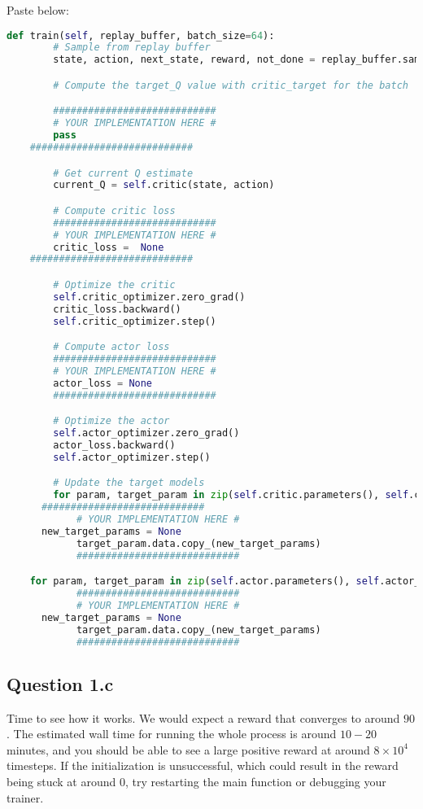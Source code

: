 \documentclass[12pt]{article}
\begin{document}
Paste below:
\begin{solution}
\begin{lstlisting}[language=Python]
def train(self, replay_buffer, batch_size=64):
		# Sample from replay buffer
		state, action, next_state, reward, not_done = replay_buffer.sample(batch_size)

		# Compute the target_Q value with critic_target for the batch

		############################
		# YOUR IMPLEMENTATION HERE #
		pass
    ############################

		# Get current Q estimate
		current_Q = self.critic(state, action)

		# Compute critic loss
		############################
		# YOUR IMPLEMENTATION HERE #
		critic_loss =  None
    ############################

		# Optimize the critic
		self.critic_optimizer.zero_grad()
		critic_loss.backward()
		self.critic_optimizer.step()

		# Compute actor loss
		############################
		# YOUR IMPLEMENTATION HERE #
		actor_loss = None
 		############################

		# Optimize the actor
		self.actor_optimizer.zero_grad()
		actor_loss.backward()
		self.actor_optimizer.step()

		# Update the target models
		for param, target_param in zip(self.critic.parameters(), self.critic_target.parameters()):
      ############################
			# YOUR IMPLEMENTATION HERE #
      new_target_params = None
			target_param.data.copy_(new_target_params)
	 		############################

    for param, target_param in zip(self.actor.parameters(), self.actor_target.parameters()):
			############################
			# YOUR IMPLEMENTATION HERE #
      new_target_params = None
			target_param.data.copy_(new_target_params)
	 		############################
\end{lstlisting}
\end{solution}

\subsection*{Question 1.c} 
Time to see how it works. We would expect a reward that converges to around $90$. The estimated wall time for running the whole process is around $10-20$ minutes, and you should be able to see a large positive reward at around  $8\times10^4$  timesteps. If the initialization is unsuccessful, which could result in the reward being stuck at around  $0$, try restarting the main function or debugging your trainer.
\end{document}
